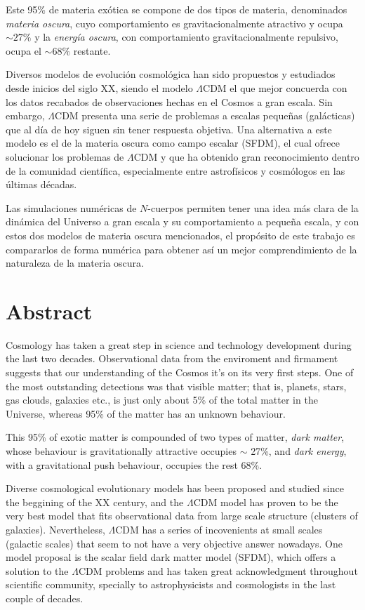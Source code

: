 \documentclass[a4paper,openright,12pt]{book}
\begin{document}
Este 95\% de materia exótica se compone de dos tipos de materia, denominados \textit{materia oscura}, cuyo comportamiento es gravitacionalmente atractivo y ocupa $\sim 27\% $ y  la \textit{energía oscura}, con comportamiento gravitacionalmente repulsivo, ocupa el $\sim 68\%$ restante. 

Diversos modelos de evolución cosmológica han sido propuestos y estudiados desde inicios del siglo XX, siendo el modelo $\Lambda$CDM el que mejor concuerda con los datos recabados de observaciones hechas en el Cosmos a gran escala. Sin embargo, $\Lambda$CDM presenta una serie de problemas a escalas pequeñas (galácticas) que al día de hoy siguen sin tener respuesta objetiva. Una alternativa a este modelo es el de la materia oscura como campo escalar (SFDM), el cual ofrece solucionar los problemas de $\Lambda$CDM y que ha obtenido gran reconocimiento dentro de la comunidad científica, especialmente entre astrofísicos y cosmólogos en las últimas décadas.

Las simulaciones numéricas de $N$-cuerpos permiten tener una idea más clara de la dinámica del Universo a gran escala y su comportamiento a pequeña escala, y con estos dos modelos de materia oscura mencionados, el propósito de este trabajo es compararlos de forma numérica para obtener así un mejor comprendimiento de la naturaleza de la materia oscura.

\chapter*{Abstract} %
Cosmology has taken a great step in science and technology development during the last two decades. Observational data from the enviroment and firmament suggests that our understanding of the Cosmos it's on its very first steps. One of the most outstanding detections was that visible matter; that is, planets, stars, gas clouds, galaxies etc., is just only about 5\% of the total matter in the Universe, whereas 95\% of the matter has an unknown behaviour.

This 95\% of exotic matter is compounded of two types of matter, \textit{dark matter}, whose behaviour is gravitationally attractive occupies $\sim$ 27\%, and \textit{dark energy}, with a gravitational push behaviour, occupies the rest 68\%.

Diverse cosmological evolutionary models has been proposed and studied since the beggining of the XX century, and the $\Lambda$CDM model has proven to be the very best model that fits observational data from large scale structure (clusters of galaxies). Nevertheless, $\Lambda$CDM has a series of incovenients at small scales (galactic scales) that seem to not have a very objective answer nowadays. One model proposal is the scalar field dark matter model (SFDM), which offers a solution to the $\Lambda$CDM problems and has taken great acknowledgment throughout scientific community, specially to astrophysicists and cosmologists in the last couple of decades.
\end{document}
